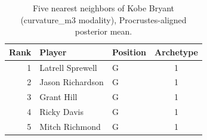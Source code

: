 \begin{table}[htbp]
  \centering\small
  \begin{tabular}{rllc}
    \toprule
    Rank & Player & Position & Archetype \\
    \midrule
    1 & Latrell Sprewell & G & 1 \\
    2 & Jason Richardson & G & 1 \\
    3 & Grant Hill & G & 1 \\
    4 & Ricky Davis & G & 1 \\
    5 & Mitch Richmond & G & 1 \\
    \bottomrule
  \end{tabular}
  \caption{Five nearest neighbors of Kobe Bryant (curvature_m3 modality), Procrustes-aligned posterior mean.}
  \label{tab:Kobe_Bryant_neighbors_curvature_m3}
\end{table}

